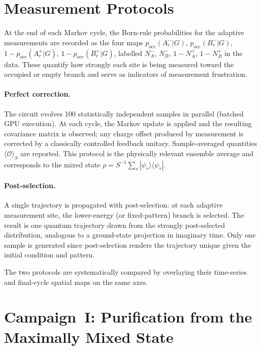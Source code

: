 \documentclass[twocolumn,aps,prx,10pt,floatfix]{revtex4-2}
\begin{document}
\section{Measurement Protocols}
\label{sec:protocols}

At the end of each Markov cycle, the Born-rule probabilities for the
adaptive measurements are recorded as the four maps
$p_\text{occ}(A^-_{r}|G)$,
$p_\text{occ}(B^-_{r}|G)$,
$1 - p_\text{occ}(A^+_{r}|G)$,
$1 - p_\text{occ}(B^+_{r}|G)$,
labelled $N^-_A$, $N^-_B$, $1-N^+_A$, $1-N^+_B$ in the data.
These quantify how strongly each site is being measured toward the occupied
or empty branch and serve as indicators of measurement frustration.

\paragraph{Perfect correction.}
The circuit evolves 100 statistically independent samples in parallel
(batched GPU execution).  At each cycle, the Markov update is applied and
the resulting covariance matrix is observed; any charge offset produced by
measurement is corrected by a classically controlled feedback unitary.
Sample-averaged quantities $\langle \mathcal{O}\rangle_S$ are reported.
This protocol is the physically relevant ensemble average and corresponds
to the mixed state $\rho = S^{-1}\sum_s |\psi_s\rangle\langle\psi_s|$.

\paragraph{Post-selection.}
A single trajectory is propagated with post-selection: at each adaptive
measurement site, the lower-energy (or fixed-pattern) branch is selected.
The result is one quantum trajectory drawn from the strongly post-selected
distribution, analogous to a ground-state projection in imaginary time.
Only one sample is generated since post-selection renders the trajectory
unique given the initial condition and pattern.

The two protocols are systematically compared by overlaying their
time-series and final-cycle spatial maps on the same axes.

\section{Campaign~I: Purification from the Maximally Mixed State}
\label{sec:purification}
\end{document}
